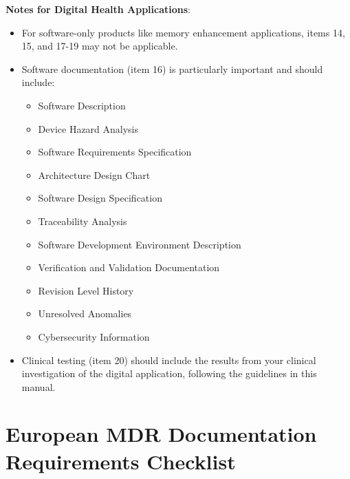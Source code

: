 \begin{tcolorbox}[title=510(k) Submission Checklist]
\textbf{Notes for Digital Health Applications}:
\begin{itemize}
    \item For software-only products like memory enhancement applications, items 14, 15, and 17-19 may not be applicable.
    
    \item Software documentation (item 16) is particularly important and should include:
    \begin{itemize}
        \item Software Description
        \item Device Hazard Analysis
        \item Software Requirements Specification
        \item Architecture Design Chart
        \item Software Design Specification
        \item Traceability Analysis
        \item Software Development Environment Description
        \item Verification and Validation Documentation
        \item Revision Level History
        \item Unresolved Anomalies
        \item Cybersecurity Information
    \end{itemize}
    
    \item Clinical testing (item 20) should include the results from your clinical investigation of the digital application, following the guidelines in this manual.
\end{itemize}
\end{tcolorbox}

\section{European MDR Documentation Requirements Checklist}

